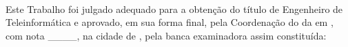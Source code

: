 %

\thispagestyle{empty}
\begin{center}
    \MakeUppercase{\autor}\par
    \vspace{0.5 cm} 	
    \Large\MakeUppercase{\titulo}\\
\end{center}
    \vspace{0.2 cm}
    \assinatura{\autor}
    \vspace{0.6 cm}
     Este Trabalho foi julgado adequado para a obtenção do título de Engenheiro de
Teleinformática e aprovado, em sua forma final, pela Coordenação do {\curso} da {\instituicao} em {\DataDefesa}, com nota \_\_\_\_, na cidade de  \Local, pela banca examinadora assim constituída:
     \vspace{0.2 cm}
     \assinatura{\membroa\\}
     \assinatura{\membrob \\}
     \vspace{0.2 cm}
\vfill\vfill
\begin{center}
\setlength{\parskip}{.3cm}
{\normalfont{\Local}} \par
{\normalfont{\Data}}
\end{center}
